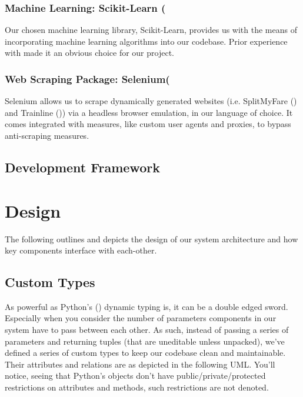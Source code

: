 \documentclass[11pt]{article}
\begin{document}
\subsubsection{Machine Learning: Scikit-Learn (\texorpdfstring{\cite{scikitlearn}})} \label{scikitlearn}
Our chosen machine learning library, Scikit-Learn, provides us with the means of incorporating machine learning algorithms into our codebase. Prior experience with made it an obvious choice for our project.

\subsubsection{Web Scraping Package: Selenium(\texorpdfstring{\cite{selenium}})} \label{selenium}
Selenium allows us to scrape dynamically generated websites (i.e. SplitMyFare (\cite {splitmyfare}) and Trainline (\cite{trainline})) via a headless browser emulation, in our language of choice. It comes integrated with measures, like custom user agents and proxies, to bypass anti-scraping measures.






 
\subsection{Development Framework} \label{development-framework}



\section{Design} \label{design}

The following outlines and depicts the design of our system architecture and how key components interface with each-other.


\subsection{Custom Types} \label{custom-types}

As powerful as Python's (\cite{python}) dynamic typing is, it can be a double edged sword. Especially when you consider the number of parameters components in our system have to pass between each other. As such, instead of passing a series of parameters and returning tuples (that are uneditable unless unpacked), we've defined a series of custom types to keep our codebase clean and maintainable. Their attributes and relations are as depicted in the following UML. You'll notice, seeing that Python's objects don't have public/private/protected restrictions on attributes and methods, such restrictions are not denoted.
\end{document}
